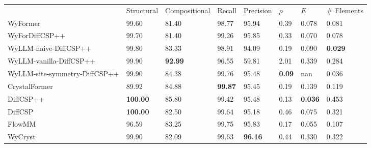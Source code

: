 \begin{tabular}{llllllll}
{} & {Structural} & {Compositional} & {Recall} & {Precision} & {$\rho$} & {$E$} & {# Elements} \\
WyFormer & 99.60 & 81.40 & 98.77 & 95.94 & 0.39 & 0.078 & 0.081 \\
WyForDiffCSP++ & 99.70 & 81.40 & 99.26 & 95.85 & 0.33 & 0.070 & 0.078 \\
WyLLM-naive-DiffCSP++ & 99.80 & 83.33 & 98.91 & 94.09 & 0.19 & 0.090 & \bfseries 0.029 \\
WyLLM-vanilla-DiffCSP++ & 99.90 & \bfseries 92.99 & 96.55 & 59.81 & 2.01 & 0.339 & 0.284 \\
WyLLM-site-symmetry-DiffCSP++ & 99.90 & 84.38 & 99.76 & 95.48 & \bfseries 0.09 & nan & 0.036 \\
CrystalFormer & 89.92 & 84.88 & \bfseries 99.87 & 95.45 & 0.19 & 0.139 & 0.119 \\
DiffCSP++ & \bfseries 100.00 & 85.80 & 99.42 & 95.48 & 0.13 & \bfseries 0.036 & 0.453 \\
DiffCSP & \bfseries 100.00 & 82.50 & 99.64 & 95.18 & 0.46 & 0.075 & 0.321 \\
FlowMM & 96.59 & 83.25 & 99.75 & 95.83 & 0.17 & 0.055 & 0.107 \\
WyCryst & 99.90 & 82.09 & 99.63 & \bfseries 96.16 & 0.44 & 0.330 & 0.322 \\
\end{tabular}

